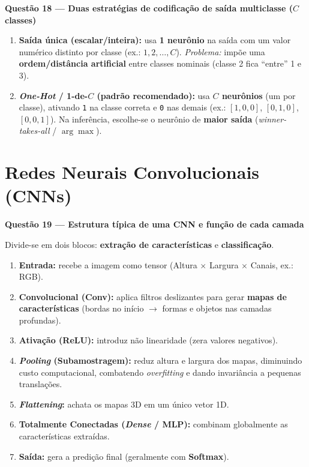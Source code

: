 \documentclass[10pt,a4paper]{article}
\newcommand{\questao}[2]{%
  \needspace{4\baselineskip}%
  \vspace{0.45em}\noindent
  {\color{azulufersa}\bfseries Questão #1 --- #2}\par\nopagebreak\vspace{0.15em}\noindent\ignorespaces%
}
\begin{document}
\questao{18}{Duas estratégias de codificação de saída multiclasse ($C$ classes)}
\begin{enumerate}
  \item \textbf{Saída única (escalar/inteira):} usa \textbf{1 neurônio} na saída com um valor numérico distinto por classe (ex.: $1, 2, \dots, C$). \emph{Problema:} impõe uma \textbf{ordem/distância artificial} entre classes nominais (classe 2 fica \enquote{entre} 1 e 3).
  \item \textbf{\emph{One-Hot} / 1-de-$C$ (padrão recomendado):} usa \textbf{$C$ neurônios} (um por classe), ativando \texttt{1} na classe correta e \texttt{0} nas demais (ex.: $[1,0,0]$, $[0,1,0]$, $[0,0,1]$). Na inferência, escolhe-se o neurônio de \textbf{maior saída} (\emph{winner-takes-all} / $\arg\max$).
\end{enumerate}

\section{Redes Neurais Convolucionais (CNNs)}

\questao{19}{Estrutura típica de uma CNN e função de cada camada}
Divide-se em dois blocos: \textbf{extração de características} e \textbf{classificação}.
\begin{enumerate}
  \item \textbf{Entrada:} recebe a imagem como tensor (Altura $\times$ Largura $\times$ Canais, ex.: RGB).
  \item \textbf{Convolucional (Conv):} aplica filtros deslizantes para gerar \textbf{mapas de características} (bordas no início $\to$ formas e objetos nas camadas profundas).
  \item \textbf{Ativação (ReLU):} introduz não linearidade (zera valores negativos).
  \item \textbf{\emph{Pooling} (Subamostragem):} reduz altura e largura dos mapas, diminuindo custo computacional, combatendo \emph{overfitting} e dando invariância a pequenas translações.
  \item \textbf{\emph{Flattening}:} achata os mapas 3D em um único vetor 1D.
  \item \textbf{Totalmente Conectadas (\emph{Dense} / MLP):} combinam globalmente as características extraídas.
  \item \textbf{Saída:} gera a predição final (geralmente com \textbf{Softmax}).
\end{enumerate}
\end{document}
